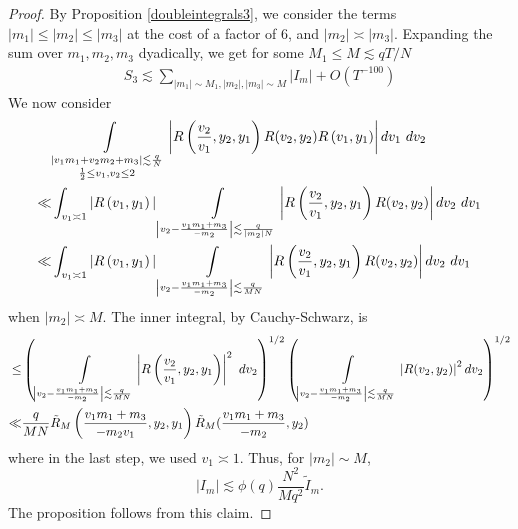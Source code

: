 \begin{proof}
By Proposition \ref{doubleintegrals3}, we consider the terms $|m_1|\leq |m_2|\leq|m_3|$ at the cost of a factor of $6$, and $|m_2|\asymp|m_3|$. Expanding the sum over $m_1,m_2,m_3$ dyadically, we get for some $M_1\leq M \lesssim qT/N $ \begin{align*}
    S_3\lesssim \sum_{|m_1|\sim M_1,|m_2|,|m_3|\sim M}|I_m| + O(T^{-100})
\end{align*}
We now consider
\begin{align*} 
   & \int\displaylimits_{\substack{
        |v_1m_1+v_2m_2+m_3|\lesssim \frac{q}{N}\\
        \frac{1}{2}\leq v_1,v_2\leq 2
    }} \left| R\left(\frac{v_2}{v_1},y_2,y_1\right)
    R(v_2,y_2)R\left(v_1,y_1\right)\right| dv_1 \ dv_2\\
     \ll& 
    \int_{v_1\asymp 1} |R\left(v_1,y_1\right)|
    \int\displaylimits_{\left|v_2 - \frac{v_1m_1+m_3}{-m_2}\right|\lesssim \frac{q}{|m_2|N}} \left| R\left(\frac{v_2}{v_1},y_2,y_1\right)
    R(v_2,y_2)\right|  dv_2 \ dv_1\\
    \ll& \int_{v_1\asymp 1} |R\left(v_1,y_1\right)|
    \int\displaylimits_{\left|v_2 - \frac{v_1m_1+m_3}{-m_2}\right|\lesssim \frac{q}{MN}} \left| R\left(\frac{v_2}{v_1},y_2,y_1\right)
    R(v_2,y_2)\right|  dv_2 \ dv_1\\
\end{align*}
when $|m_2|\asymp M$. The inner integral, by Cauchy-Schwarz,
is \begin{align*}
    \leq & \left(\int\displaylimits_{\left|v_2 - \frac{v_1m_1+m_3}{-m_2}\right|\lesssim \frac{q}{MN}} \left| R\left(\frac{v_2}{v_1},y_2,y_1\right)\right|^2 \ dv_2 \right)^{1/2}
    \left(
    \int\displaylimits_{\left|v_2 - \frac{v_1m_1+m_3}{-m_2}\right|\lesssim \frac{q}{MN}} \left|
    R(v_2,y_2)\right|^2  dv_2\right)^{1/2}\\
    \ll& \frac{q}{MN} \tilde{R}_M\left(\frac{v_1m_1+m_3}{-m_2v_1},y_2,y_1\right)  \tilde{R}_M(\frac{v_1m_1+m_3}{-m_2},y_2)
\end{align*}
where in the last step, we used $v_1\asymp 1$.
Thus, for $|m_2|\sim M$,
\[
|I_m|\lesssim \phi(q)\frac{N^2}{Mq^2}\tilde{I}_m.
\]
The proposition follows from this claim.
\end{proof}


